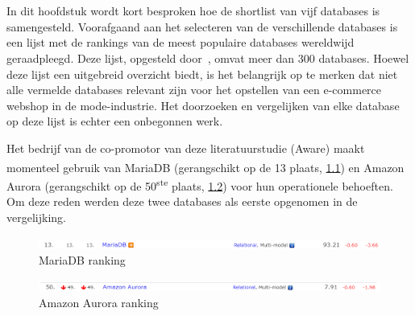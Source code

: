 \chapter{}%
\label{ch:shortlist}

In dit hoofdstuk wordt kort besproken hoe de shortlist van vijf databases is samengesteld. Voorafgaand aan het selecteren van de verschillende databases is een lijst met de rankings van de meest populaire databases wereldwijd geraadpleegd. Deze lijst, opgesteld door~\autocite{DBEngines}, omvat meer dan 300 databases. Hoewel deze lijst een uitgebreid overzicht biedt, is het belangrijk op te merken dat niet alle vermelde databases relevant zijn voor het opstellen van een e-commerce webshop in de mode-industrie. Het doorzoeken en vergelijken van elke database op deze lijst is echter een onbegonnen werk. 


Het bedrijf van de co-promotor van deze literatuurstudie (Aware) maakt momenteel gebruik van MariaDB (gerangschikt op de 13\textsuperscript{} plaats, \ref{fig:mariadbranking}) en Amazon Aurora (gerangschikt op de 50\textsuperscript{ste} plaats, \ref{fig:amazonauroraranking}) voor hun operationele behoeften. Om deze reden werden deze twee databases als eerste opgenomen in de vergelijking.

\begin{figure}[H]
    \centering
    \includegraphics[width=\linewidth]{graphics/mariadbranking}
    \caption[MariaDB ranking]{MariaDB ranking~\autocite{DBEngines}}
    \label{fig:mariadbranking}
\end{figure}

\begin{figure}[H]
    \centering
    \includegraphics[width=\linewidth]{graphics/amazonauroraranking}
    \caption[Amazon Aurora ranking]{Amazon Aurora ranking~\autocite{DBEngines}}
    \label{fig:amazonauroraranking}
\end{figure}

